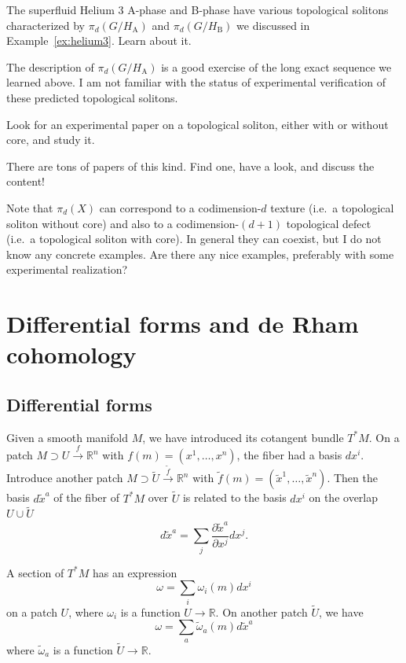 \documentclass[12pt]{article}
\numberwithin{equation}{section}
\theoremstyle{remark}
\def\bR{\mathbb{R}}
\begin{document}
\begin{question}
The superfluid Helium 3 A-phase and B-phase have various topological solitons characterized by $\pi_d(G/H_\text{A})$
and $\pi_d(G/H_\text{B})$ we discussed in Example~\ref{ex:helium3}.
Learn about it. 
\end{question}

The description of $\pi_d(G/H_\text{A})$ is a good exercise of the long exact sequence we learned above.
I am not familiar with the status of experimental verification of these predicted topological solitons.

\begin{question}
Look for an experimental paper on a topological soliton, either with or without core, and study it.
\end{question}
There are tons of papers of this kind. Find one, have a look, and discuss the content!

\begin{question}
Note that $\pi_d(X)$ can correspond to a codimension-$d$ texture (i.e.~a topological soliton without core)
and also to a codimension-$(d+1)$ topological defect (i.e.~a topological soliton with core).
In general they can coexist, but I do not know any concrete examples.
Are there any nice examples, preferably with some experimental realization?
\end{question}

\section{Differential forms and de Rham cohomology}
\label{sec:deRham}

\subsection{Differential forms}
Given a smooth manifold $M$, we have introduced its cotangent bundle $T^*M$.
On a patch $M\supset U \xrightarrow{f} \bR^n$ with $f(m)=(x^1,\ldots,x^n)$,
the fiber had a basis $dx^i$.
Introduce another patch $M\supset \tilde U \xrightarrow{\tilde f} \bR^n$ with $\tilde f(m)=(\tilde x^1,\ldots,\tilde x^n)$.
Then the basis $d\tilde x^a$ of the fiber of $T^*M$ over $\tilde U$ is related to the basis $dx^i$ on the overlap $U\cup \tilde U$ \begin{equation}
  d\tilde x^a = \sum_{j} \frac{\partial \tilde x^a}{\partial x^j} dx^j.
\end{equation}

A section of $T^*M$ has an expression \begin{equation}
  \omega = \sum_i \omega_i(m) dx^i
\end{equation} on a patch $U$, where $\omega_i$ is a function $U\to \bR$.
On another patch $\tilde U$, we have \begin{equation}
  \omega = \sum_a \tilde\omega_a(m) d\tilde x^a
\end{equation} where $\tilde\omega_a$ is a function $\tilde U\to \bR$.
\end{document}
